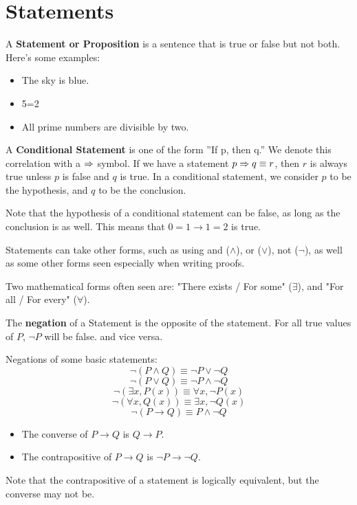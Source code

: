 \documentclass{article}
\begin{document}
\section{Statements}
A \textbf{Statement or Proposition} is a sentence that is true or false but not both.
Here's some examples:
\begin{ex}
\begin{itemize}
    \item The sky is blue.
    \item 5=2
    \item All prime numbers are divisible by two.
\end{itemize}
\end{ex}
\par 

A \textbf{Conditional Statement} is one of the form ”If p, then q.” We denote this correlation with a
$\Rightarrow$ symbol. If we have a statement $ p \Rightarrow q \equiv r$, then $r$ is always true unless $p$ is false and $q$ is true.
In a conditional statement, we consider $p$ to be the hypothesis, and $q$ to be the conclusion.
\par 

Note that the hypothesis of a conditional statement can be false, as long as the conclusion is as well.
This means that $0=1 \to 1=2$ is true.

\par 
Statements can take other forms, such as using and ($\land$), or ($\lor$), not ($\lnot$), as well as some other forms 
seen especially when writing proofs.
\par

Two mathematical forms often seen are: "There exists / For some" ($\exists$), and "For all
 / For every" ($\forall$).
\par 
The \textbf{negation} of a Statement is the opposite of the statement. For all true values of $P$, $\lnot P $ will be false.
and vice versa.


\begin{df}
    Negations of some basic statements:
    \[\lnot (P \land Q ) \equiv \lnot P \lor \lnot Q\]
    \[\lnot(P \lor Q) \equiv \lnot P \land \lnot Q\]
    \[\lnot(\exists x, P(x)) \equiv \forall x, \lnot P(x)\]
    \[\lnot(\forall x , Q(x))\equiv \exists x, \lnot Q(x)\]
    \[\lnot(P \to Q) \equiv P \land \lnot Q\]

\end{df}

\begin{df}
    \begin{itemize}
        \item The converse of $P \to Q$ is $Q \to P$.
        \item The contrapositive of $P \to Q$ is $\lnot P \to \lnot Q$.
    \end{itemize}
    Note that the contrapositive of a statement is logically equivalent, but the converse may not be.
\end{df}
\end{document}
